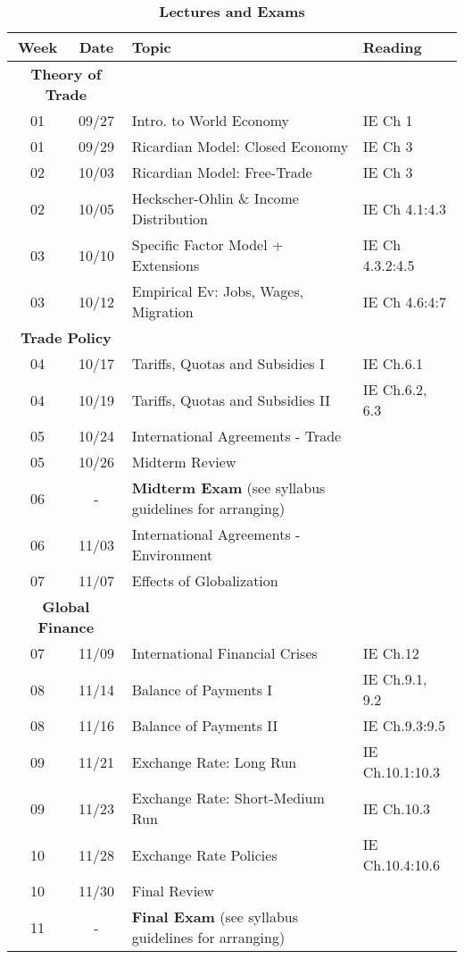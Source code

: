 \documentclass[10pt]{article}
\newcommand{\ra}[1]{\renewcommand{\arraystretch}{#1}}
\begin{document}
\begin{table}[h!]
	\caption*{\large\textbf{Lectures and Exams}}
	\centering
	\ra{1.5}
	\begin{tabular}{@{\extracolsep{0.5cm}} c c l l @{}}
		\toprule
		\textbf{Week} & \textbf{Date} & \textbf{Topic} & \textbf{Reading}  \\ \toprule
		 \multicolumn{2}{c}{\textbf{Theory of Trade}} & & \\
		01 & 09/27 & Intro. to World Economy & IE Ch 1 \\
		01 & 09/29 & Ricardian Model: Closed Economy & IE Ch 3 \\
		02 & 10/03 & Ricardian Model: Free-Trade & IE Ch 3 \\
		02 & 10/05 & Heckscher-Ohlin \& Income Distribution & IE Ch 4.1:4.3 \\
		03 & 10/10 & Specific Factor Model + Extensions & IE Ch 4.3.2:4.5  \\
		03 & 10/12 & Empirical Ev: Jobs, Wages, Migration  & IE Ch 4.6:4:7  \\ 
		\multicolumn{2}{c}{\textbf{Trade Policy}} & & \\
		04 & 10/17 & Tariffs, Quotas and Subsidies I & IE Ch.6.1\\ 
		04 & 10/19 & Tariffs, Quotas and Subsidies II & IE Ch.6.2, 6.3  \\
		05 & 10/24 & International Agreements - Trade &  \\
		05 & 10/26 & Midterm Review & \\ \midrule 
		06 & - & \textbf{Midterm Exam} (see syllabus guidelines for arranging) & \\ \midrule
		06 & 11/03 & International Agreements - Environment &   \\
		07 & 11/07 & Effects of Globalization  &   \\
		\multicolumn{2}{c}{\textbf{Global Finance}} & & \\
		07 & 11/09 & International Financial Crises &  IE Ch.12  \\ 
		08 & 11/14 & Balance of Payments I & IE Ch.9.1, 9.2  \\ 
		08 & 11/16 & Balance of Payments II & IE Ch.9.3:9.5 \\
		09 & 11/21 & Exchange Rate: Long Run & IE Ch.10.1:10.3  \\
		09 & 11/23 & Exchange Rate: Short-Medium Run & IE Ch.10.3   \\
		10 & 11/28 & Exchange Rate Policies & IE Ch.10.4:10.6 \\ 
		10 & 11/30 & Final Review &   \\  \midrule
		11 & - & \textbf{Final Exam} (see syllabus guidelines for arranging) & \\
		\bottomrule
	\end{tabular}
\end{table}
\end{document}
